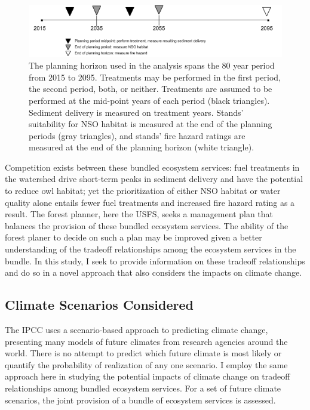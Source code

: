 \begin{figure}
\centering
\includegraphics[width=.85\textwidth]{../images/Drink_PlanningHorizon_Sketch}
\caption[Planning horizon schematic]{The planning horizon used in the analysis spans the 80 year period from 2015 to 2095. Treatments may be performed in the first period, the second period, both, or neither. Treatments are assumed to be performed at the mid-point years of each period (black triangles). Sediment delivery is measured on treatment years. Stands' suitability for NSO habitat is measured at the end of the planning periods (gray triangles), and stands' fire hazard ratings are measured at the end of the planning horizon (white triangle).}
\label{fig:drinkPlanningHorizon}
\end{figure}

Competition exists between these bundled ecosystem services: fuel treatments in the watershed drive short-term peaks in sediment delivery and have the potential to reduce owl habitat; yet the prioritization of either NSO habitat or water quality alone entails fewer fuel treatments and increased fire hazard rating as a result. The forest planner, here the USFS, seeks a management plan that balances the provision of these bundled ecosystem services. The ability of the forest planer to decide on such a plan may be improved given a better understanding of the tradeoff relationships among the ecosystem services in the bundle. In this study, I seek to provide information on these tradeoff relationships and do so in a novel approach that also considers the impacts on climate change.

\subsection{Climate Scenarios Considered}
The IPCC uses a scenario-based approach to predicting climate change, presenting many models of future climates from research agencies around the world. There is no attempt to predict which future climate is most likely or quantify the probability of realization of any one scenario. I employ the same approach here in studying the potential impacts of climate change on tradeoff relationships among bundled ecosystem services. For a set of future climate scenarios, the joint provision of a bundle of ecosystem services is assessed.

